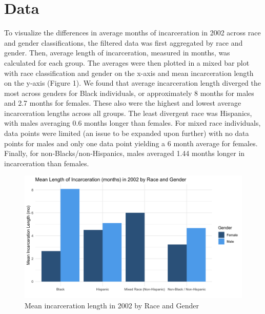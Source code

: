 \documentclass[12pt]{article}
\begin{document}
\section*{Data}
To visualize the differences in average months of incarceration in 2002 across race and gender classifications, the filtered data was first aggregated by race and gender. Then, average length of incarceration, measured in months, was calculated for each group. The averages were then plotted in a mixed bar plot with race classification and gender on the x-axis and mean incarceration length on the y-axis (Figure 1). We found that average incarceration length diverged the most across genders for Black individuals, or approximately 8 months for males and 2.7 months for females. These also were the highest and lowest average incarceration lengths across all groups. The least divergent race was Hispanics, with males averaging 0.6 months longer than females. For mixed race individuals, data points were limited (an issue to be expanded upon further) with no data points for males and only one data point yielding a 6 month average for females. Finally, for non-Blacks/non-Hispanics, males averaged 1.44 months longer in incarceration than females. 

\begin{figure}[H]
    \begin{center}
        \includegraphics[width=.85\textwidth]{incarcerations_by_racegender}
    \end{center}
    \caption{Mean incarceration length in 2002 by Race and Gender}
    \label{fig:graph}
\end{figure}


\begin{table}[H]

\end{table}
\end{document}
